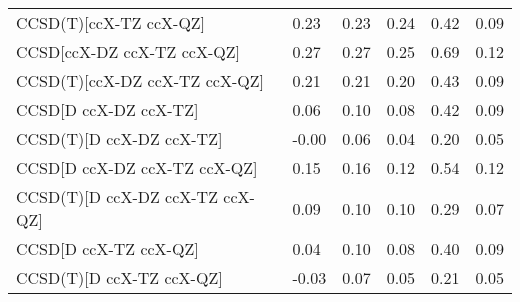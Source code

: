 \begin{table}
\begin{tabular}{l l l l l l }
    CCSD(T)[ccX-TZ ccX-QZ] & 0.23 & 0.23 & 0.24 & 0.42 & 0.09 \\ 
    CCSD[ccX-DZ ccX-TZ ccX-QZ] & 0.27 & 0.27 & 0.25 & 0.69 & 0.12 \\ 
    CCSD(T)[ccX-DZ ccX-TZ ccX-QZ] & 0.21 & 0.21 & 0.20 & 0.43 & 0.09 \\ 
    CCSD[D ccX-DZ ccX-TZ] & 0.06 & 0.10 & 0.08 & 0.42 & 0.09 \\ 
    CCSD(T)[D ccX-DZ ccX-TZ] & -0.00 & 0.06 & 0.04 & 0.20 & 0.05 \\ 
    CCSD[D ccX-DZ ccX-TZ ccX-QZ] & 0.15 & 0.16 & 0.12 & 0.54 & 0.12 \\ 
    CCSD(T)[D ccX-DZ ccX-TZ ccX-QZ] & 0.09 & 0.10 & 0.10 & 0.29 & 0.07 \\ 
    CCSD[D ccX-TZ ccX-QZ] & 0.04 & 0.10 & 0.08 & 0.40 & 0.09 \\ 
    CCSD(T)[D ccX-TZ ccX-QZ] & -0.03 & 0.07 & 0.05 & 0.21 & 0.05 \\ 
    \bottomrule
  \end{tabular}
\end{table}
